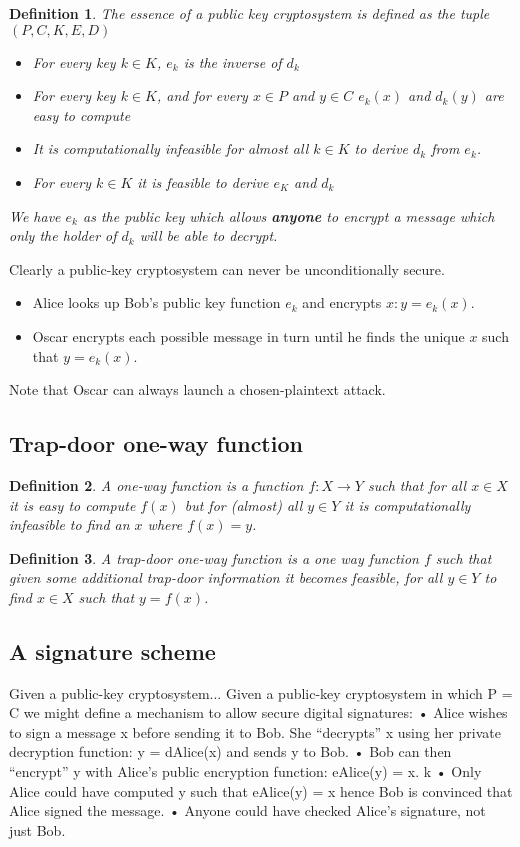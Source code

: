 \documentclass{article}
\theoremstyle{quest}
\newtheorem*{definition}{Definition}
\begin{document}
\begin{definition}
    The essence of a \textit{public key cryptosystem} is defined as the tuple
    $(P,C,K,E,D)$
    \begin{itemize}
        \item For every key $k \in K$, $e_k$ is the inverse of $d_k$
        \item For every key $k \in K$,
            and for every $x \in P$ and $y \in C$
            $e_k(x)$ and $d_k(y)$ are easy to compute
        \item It is computationally infeasible for almost all $k \in K$
            to derive $d_k$ from $e_k$.
        \item For every $k \in K$ it is feasible to derive $e_K$ and $d_k$
    \end{itemize}
    We have $e_k$ as the public key which allows \textbf{anyone} to encrypt a message
    which only the holder of $d_k$ will be able to decrypt.
\end{definition}

Clearly a public-key cryptosystem can never be unconditionally secure.
\begin{itemize}
    \item Alice looks up Bob’s public key function $e_k$ and encrypts $x : y = e_k(x)$.
    \item Oscar encrypts each possible message in turn until he finds the unique $x$ such that $y = e_k(x)$.
\end{itemize}
Note that Oscar can always launch a chosen-plaintext attack.

\subsection{Trap-door one-way function}
\begin{definition}
    A \textit{one-way function} is a function $f : X \rightarrow Y$ such that 
    for all $x \in X$ it is easy to compute $f(x)$ but for (almost) all $y \in Y$ it is computationally
    infeasible to find an $x$ where $f(x) = y$.
\end{definition}
\begin{definition}
    A \textit{trap-door one-way function} is a one way function $f$ such that
    given some additional trap-door information it becomes feasible, 
    for all $y \in Y$ to find $x \in X$ such that $y = f(x)$.
\end{definition}

\subsection{A signature scheme}
Given a public-key cryptosystem...
Given a public-key cryptosystem in which P = C we might define a mechanism to allow secure digital signatures:
• Alice wishes to sign a message x before sending it to Bob. She “decrypts” x using her private decryption function: y = dAlice(x) and sends y to Bob.
• Bob can then “encrypt” y with Alice’s public encryption function: eAlice(y) = x. k
• Only Alice could have computed y such that eAlice(y) = x hence Bob is convinced that
Alice signed the message.
• Anyone could have checked Alice’s signature, not just Bob.
\end{document}
